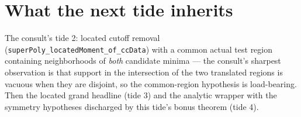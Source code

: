 \documentclass[11pt]{article}
\newcommand{\code}[1]{\texttt{#1}}
\begin{document}
\section{What the next tide inherits}

The consult's tide 2: located cutoff removal
(\code{superPoly\_locatedMoment\_of\_ccData}) with a common actual
test region containing neighborhoods of \emph{both} candidate minima
--- the consult's sharpest observation is that support in the
intersection of the two translated regions is vacuous when they are
disjoint, so the common-region hypothesis is load-bearing. Then the
located grand headline (tide 3) and the analytic wrapper with the
symmetry hypotheses discharged by this tide's bonus theorem (tide 4).
\end{document}
